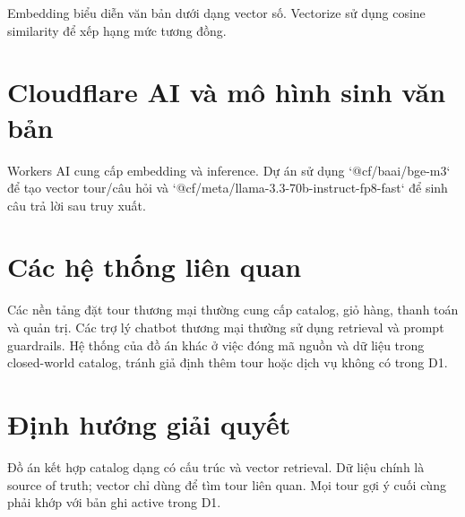 Embedding biểu diễn văn bản dưới dạng vector số. Vectorize sử dụng cosine similarity để xếp hạng mức tương đồng.

\section{Cloudflare AI và mô hình sinh văn bản}
Workers AI cung cấp embedding và inference. Dự án sử dụng `@cf/baai/bge-m3` để tạo vector tour/câu hỏi và `@cf/meta/llama-3.3-70b-instruct-fp8-fast` để sinh câu trả lời sau truy xuất.

\section{Các hệ thống liên quan}
Các nền tảng đặt tour thương mại thường cung cấp catalog, giỏ hàng, thanh toán và quản trị. Các trợ lý chatbot thương mại thường sử dụng retrieval và prompt guardrails. Hệ thống của đồ án khác ở việc đóng mã nguồn và dữ liệu trong closed-world catalog, tránh giả định thêm tour hoặc dịch vụ không có trong D1.

\section{Định hướng giải quyết}
Đồ án kết hợp catalog dạng có cấu trúc và vector retrieval. Dữ liệu chính là source of truth; vector chỉ dùng để tìm tour liên quan. Mọi tour gợi ý cuối cùng phải khớp với bản ghi active trong D1.
